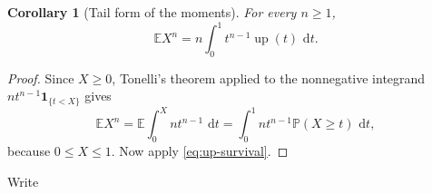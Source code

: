 \documentclass[11pt,oneside,openany]{book}
\newtheorem{corollary}[corollary]{Corollary}
\theoremstyle{definition}
\theoremstyle{remark}
\newcommand{\dd}{\,\mathrm d}
\newcommand{\one}{\mathbf 1}
\newcommand{\abs}[1]{\lvert #1\rvert}
\begin{document}
\begin{corollary}[Tail form of the moments]\label{cor:up-moments}
For every $n\ge1$,
\begin{equation}\label{eq:up-moment-integral}
 \mathbb EX^n=n\int_0^1t^{n-1}\operatorname{up}(t)\,\dd t.
\end{equation}
\end{corollary}

\begin{proof}
Since $X\ge0$, Tonelli's theorem applied to the nonnegative integrand
$nt^{n-1}\one_{\{t<X\}}$ gives
\[
 \mathbb EX^n
 =\mathbb E\int_0^Xnt^{n-1}\,\dd t
 =\int_0^1nt^{n-1}\mathbb P(X\ge t)\,\dd t,
\]
because $0\le X\le1$.  Now apply \eqref{eq:up-survival}.
\end{proof}

Write
\end{document}

